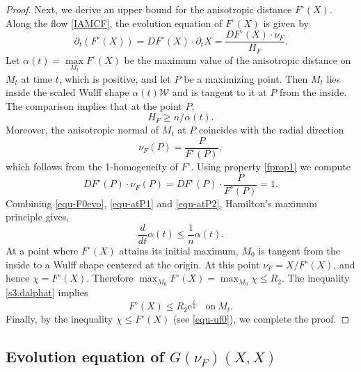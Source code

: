 \documentclass[11pt,reqno]{amsart}
\theoremstyle{definition}
\theoremstyle{remark}
\numberwithin{equation}{section}
\begin{document}
\begin{proof}
		Next, we derive an upper bound for the anisotropic distance $F^{\circ}(X)$.  Along the flow \eqref{IAMCF}, the evolution equation of $F^{\circ}(X)$ is given by
		\begin{equation}
			\partial_t \left(  F^{\circ}(X) \right) = DF^{\circ}(X)\cdot \partial_t X = \dfrac{DF^{\circ}(X)\cdot \nu_F}{H_F}.
			\label{equ-F0evo}
		\end{equation}
		Let $\alpha(t)=\max\limits_{M_t}F^{\circ}(X)$ be the maximum value of the anisotropic distance on $M_t$ at time $t$, which is positive, and let $P$ be a maximizing point. Then $M_t$ lies inside the scaled Wulff shape $\alpha(t)\mathcal{W}$ and is tangent to it at $P$ from the inside. The comparison implies that at the point $P$, 
		\begin{equation}
			H_F \geq n/\alpha(t).
			\label{equ-atP1}
		\end{equation}
		Moreover, the anisotropic normal of $M_t$ at $P$ coincides with the radial direction
		\begin{equation*}
			\nu_F(P)=\dfrac{P}{F^{\circ}(P)},
		\end{equation*}
		which follows from the 1-homogeneity of $F^{\circ}$. Using property \eqref{fprop1} we compute
		\begin{equation}
			DF^{\circ}(P)\cdot \nu_F(P) = DF^{\circ}(P)\cdot \dfrac{P}{F^{\circ}(P)}=1.
			\label{equ-atP2}
		\end{equation}
		Combining \eqref{equ-F0evo}, \eqref{equ-atP1} and \eqref{equ-atP2}, Hamilton's maximum principle \cite[Lemma 3.5]{Ha86} gives,
		\begin{equation}\label{s3.dalphat}
			\frac{d}{dt}\alpha(t)\leq\frac{1}{n}\alpha(t).
		\end{equation}
		At a point where $F^\circ(X)$ attains its initial maximum, $M_0$ is tangent from the inside to a Wulff shape centered at the origin. At this point $\nu_F=X/F^\circ(X)$, and hence $\chi=F^\circ(X)$. Therefore $\max_{M_0}F^\circ(X)=\max_{M_0}\chi\leq R_2$. The inequality \eqref{s3.dalphat} implies
		\begin{equation*}
			F^{\circ}(X)\leq R_2\mathrm{e}^{\frac{t}{n}}\ \ \ \ \mbox{on}\ M_t.
		\end{equation*}		
		Finally, by the inequality $\chi \leq F^{\circ}(X)$ (see \eqref{equ-uf0}), we complete the proof.
	\end{proof}
	
	\subsection{\texorpdfstring{Evolution equation of $G(\nu_F)(X,X)$}{Evolution equation of G(nuF)(X,X)}}
	
\end{document}
